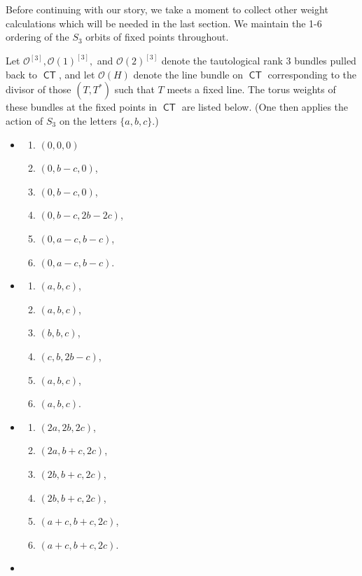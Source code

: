 \documentclass{article}
\renewcommand{\O}{\mathcal{O}}
\DeclareMathOperator{\CT}{\mathsf{CT}}
\begin{document}
Before continuing with our story, we take a moment to collect other weight calculations which will be needed in the last section.  We maintain the 1-6 ordering of the $S_{3}$ orbits of fixed points throughout. 
\begin{proposition}
\label{proposition:weightstautological}
Let $\O^{[3]}, \O(1)^{[3]},$ and $\O(2)^{[3]}$ denote the tautological rank $3$ bundles pulled back to $\CT$, and let $\O(H)$ denote the line bundle on $\CT$ corresponding to the divisor of those $(T,T^{*})$ such that $T$ meets a fixed line. The torus weights of these bundles at the fixed points in $\CT$ are listed below.  (One then applies the action of $S_3$ on the letters $\{a,b,c\}$.) 
\begin{itemize}
    \item[$\O^{[3]}$:] \begin{enumerate}
        \item $(0,0,0)$
        \item $(0,b-c,0)$,
        \item $(0,b-c,0)$,
        \item $(0,b-c,2b-2c)$,
        \item $(0,a-c,b-c)$,
        \item $(0,a-c,b-c)$.
    \end{enumerate}
    \item[$\O(1)^{[3]}$:] \begin{enumerate}
        \item $(a,b,c)$,
        \item $(a,b,c)$,
        \item $(b,b,c)$,
        \item $(c,b,2b-c)$,
        \item $(a,b,c)$,
        \item $(a,b,c)$.
    \end{enumerate}
    \item[$\O(2)^{[3]}$:] \begin{enumerate}
        \item $(2a,2b,2c)$,
        \item $(2a,b+c,2c)$,
        \item $(2b,b+c,2c)$,
        \item $(2b,b+c,2c)$,
        \item $(a+c,b+c,2c)$,
        \item $(a+c,b+c,2c)$.
    \end{enumerate}
    \item[$\O(3)^{[3]}$:] \begin{enumerate}

\end{enumerate}
\end{itemize}
\end{proposition}
\end{document}
